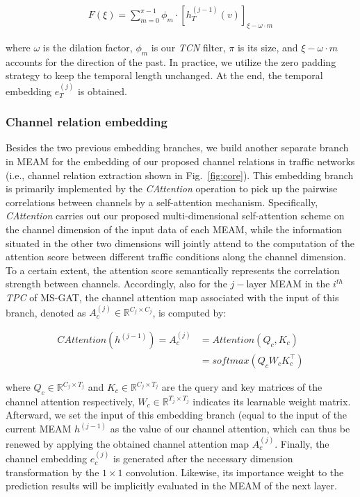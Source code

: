 \begin{equation}
    \label{eqn:dilated_causal_convolution}
    \begin{aligned}
        F(\xi) = \sum_{m=0}^{\pi-1} \phi_m \cdot [h_T^{(j-1)}(v)]_{\xi-\omega \cdot m}
    \end{aligned}
\end{equation}

where $\omega$ is the dilation factor, $\phi_m$ is our \textit{TCN} filter, $\pi$ is its size, and $\xi-\omega \cdot m$ accounts for the direction of the past. In practice, we utilize the zero padding strategy to keep the temporal length unchanged. At the end, the temporal embedding $e_T^{(j)}$ is obtained.

\subsubsection{Channel relation embedding}
Besides the two previous embedding branches, we build another separate branch in MEAM for the embedding of our proposed channel relations in traffic networks (i.e., channel relation extraction shown in Fig.~\ref{fig:core}). This embedding branch is primarily implemented by the \textit{CAttention} operation to pick up the pairwise correlations between channels by a self-attention mechanism. Specifically, \textit{CAttention}  carries out our proposed multi-dimensional self-attention scheme on the channel dimension of the input data of each MEAM, while the information situated in the other two dimensions will jointly attend to the computation of the attention score between different traffic conditions along the channel dimension. To a certain extent, the attention score semantically represents the correlation strength between channels. Accordingly, also for the $j-$layer MEAM in the $i^{th}$ \textit{TPC} of MS-GAT, the channel attention map associated with the input of this branch, denoted as $A_c^{(j)} \in \mathbb{R}^{C_j \times C_j}$, is computed by:

\begin{equation}
    \label{eqn:channel_attention}
    \begin{aligned}
        CAttention(h^{(j-1)})  = A_c^{(j)} & = Attention(Q_c, K_c)      \\
                                           & = softmax(Q_c W_c K_c^\top)
    \end{aligned}
\end{equation}

where $Q_c \in \mathbb{R}^{C_j \times T_j}$ and $K_c \in \mathbb{R}^{C_j \times T_j}$ are the query and key matrices of the channel attention respectively, $W_c \in \mathbb{R}^{T_j \times T_j}$ indicates its learnable weight matrix. Afterward, we set the input of this embedding branch (equal to the input of the current MEAM $h^{(j-1)}$ as the value of our channel attention, which can thus be renewed by applying the obtained channel attention map $A_c^{(j)}$. Finally, the channel embedding $e_c^{(j)}$ is generated after the necessary dimension transformation by the $1 \times 1$ convolution. Likewise, its importance weight to the prediction results will be implicitly evaluated in the MEAM of the next layer.